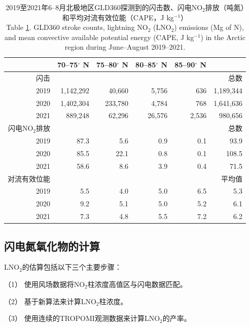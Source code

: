\begin{table}
\centering
\caption{2019至2021年6--8月北极地区GLD360探测到的闪击数、闪电NO$_2$排放（吨氮）和平均对流有效位能（CAPE，J kg$^{-1}$）\\
Table \ref{table:arctic_emission}. GLD360 stroke counts, lightning NO$_2$ (LNO$_2$) emissions (Mg of N), and mean
convective available potential energy (CAPE, J kg$^{-1}$) in the Arctic region during June--August 2019--2021.
}
\label{table:arctic_emission}
\footnotesize
\begin{tabular}{rrrrrr}
\hline
{} & 70--75$^{\circ}$ N & 75--80$^{\circ}$ N &
80--85$^{\circ}$ N &  85--90$^{\circ}$ N &  \\
\hline
闪击 & & & & & 总数 \\
\hline
2019 &   1,142,292 &     40,660 &      5,756 &       636  & 1,189,344 \\
2020 &   1,402,304 &    233,780 &      4,784 &       768  &  1,641,636 \\
2021 &     889,248 &     62,296 &     26,576 &      2,536  &  980,656 \\
\hline
闪电NO$_2$排放 & & & & & 总数 \\
\hline
2019 &      87.3 &       5.6 &       0.9 &       0.1 &   93.9 \\
2020 &      85.5 &      22.1 &       0.8 &       0.1 &  108.5 \\
2021 &      58.6 &       8.6 &       3.9 &       0.4 &   71.5 \\
\hline
对流有效位能 & & & & & 平均值 \\
\hline
2019 & 5.5  & 4.0  & 5.0  & 6.5 & 5.3 \\
2020 & 9.2  & 5.1  & 5.0  & 5.2 & 6.1 \\
2021 & 7.3  & 4.8  & 5.5  & 7.2 & 6.2 \\
\hline
\end{tabular}
\end{table}


\subsection{闪电氮氧化物的计算} \label{sec:arctic_lnox_calc}

LNO$_2$的估算包括以下三个主要步骤：

（1） 使用风场数据将NO$_2$柱浓度高值区与闪电数据匹配。

（2） 基于新算法来计算LNO$_2$柱浓度。

（3） 使用连续的TROPOMI观测数据来计算LNO$_2$的产率。

